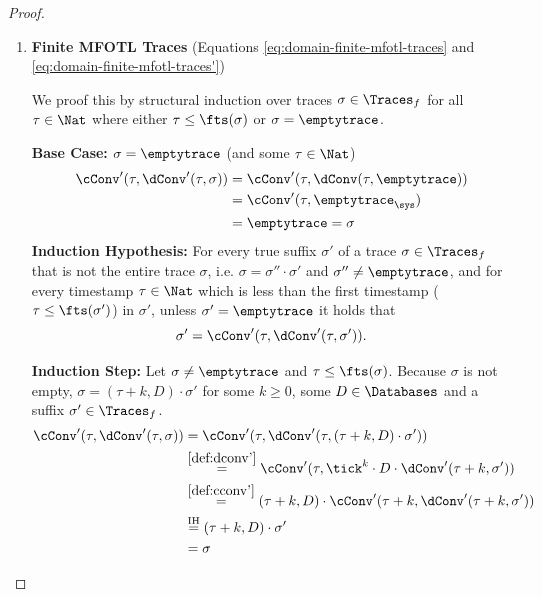 \begin{proof}
    \begin{enumerate}
        \item \textbf{Finite MFOTL Traces}
            (Equations \ref{eq:domain-finite-mfotl-traces} and
            \ref{eq:domain-finite-mfotl-traces'})
        
        We proof this by structural induction over traces $\sigma \in \Traces_f$
        for all $\tau \in \Nat$ where either $\tau \leq \fts(\sigma)$ or
        $\sigma = \emptytrace$.
    
        \textbf{Base Case:}
        $\sigma = \emptytrace$ (and some $\tau \in \Nat$)
        \begin{align*}
            \cConv'(\tau, \dConv'(\tau, \sigma))
            &= \cConv'(\tau, \dConv(\tau, \emptytrace)) \\
            &= \cConv'(\tau, \emptytrace_\sys) \\
            &= \emptytrace = \sigma
        \end{align*}
        \textbf{Induction Hypothesis:} 
        For every true suffix $\sigma'$ of a trace $\sigma \in \Traces_f$
        that is not the entire trace $\sigma$, i.e.
        $\sigma = \sigma'' \cdot \sigma'$ and $\sigma'' \neq \emptytrace$,
        and for every timestamp $\tau \in \Nat$
        which is less than the first timestamp
        ($\tau \leq \fts(\sigma')$)
        in $\sigma'$, unless $\sigma' = \emptytrace$ it holds that
        \begin{equation*}
            \sigma' = \cConv'(\tau, \dConv'(\tau, \sigma')).
        \end{equation*}
    
        \textbf{Induction Step:}
        Let $\sigma \neq \emptytrace$
        and $\tau \leq \fts(\sigma)$.
        Because $\sigma$ is not empty,
        $\sigma = \left(\tau+k, D \right) \cdot \sigma'$
        for some $k \geq 0$, some $D \in \Databases$ and
        a suffix $\sigma' \in \Traces_f$.
        \begin{align*}
            \cConv'(\tau, \dConv'(\tau, \sigma))
            &= \cConv'(\tau, \dConv'(\tau, (\tau+k, D) \cdot \sigma')) \\
            &\stackrel{\ref{def:dconv'}}{=}
                \cConv'(\tau, \tick^k \cdot D \cdot \dConv'(\tau + k, \sigma')) \\
            &\stackrel{\ref{def:cconv'}}{=}
                (\tau+k, D) \cdot \cConv'(\tau+k, \dConv'(\tau+k, \sigma')) \\
            &\stackrel{\text{IH}}{=} \left(\tau+k, D \right) \cdot \sigma' \\
            &= \sigma
        \end{align*}
    

\end{enumerate}
\end{proof}
